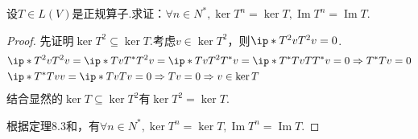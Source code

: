 \begin{problem}[17]\label{7.A.17}
    设\(T \in L(V)\)是正规算子.求证：\(\forall n \in N^*,\ker T^n=\ker T,\operatorname{Im} T^n=\operatorname{Im} T\).
\end{problem}

\begin{proof}
    先证明\(\ker T^2 \subseteq \ker T\).考虑\(v \in \ker T^2\)，则\(\ip*{T^2 v}{T^2 v}=0\).
    \begin{align*}
        &\ip*{T^2 v}{T^2 v}=\ip*{Tv}{T^*T^2v}=\ip*{Tv}{T^2T^*v}=\ip*{T^*Tv}{TT^*v}=0 \Rightarrow T^*Tv=0 \\
        &\ip*{T^*Tv}{v}=\ip*{Tv}{Tv}=0 \Rightarrow Tv=0 \Rightarrow v \in \ker T
    \end{align*}
    结合显然的\(\ker T \subseteq \ker T^2\)有\(\ker T^2=\ker T\).

    根据定理8.3和，有\(\forall n \in N^*,\ker T^n=\ker T,\operatorname{Im} T^n=\operatorname{Im} T\).
\end{proof}


